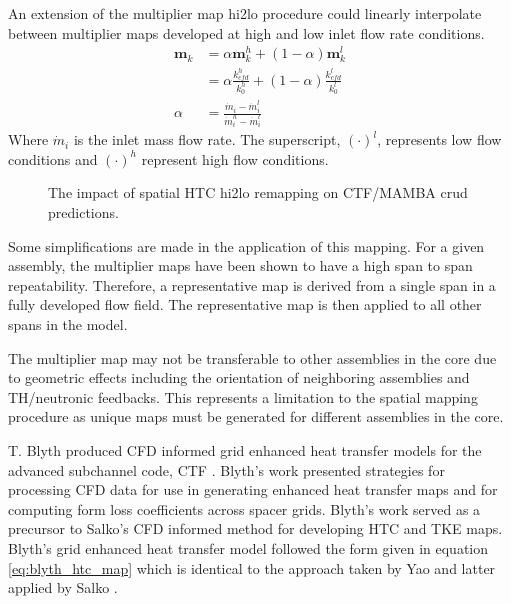     An extension of the multiplier map hi2lo procedure could linearly interpolate between multiplier maps developed at high and low inlet flow rate conditions.
    \begin{align*}
        \mathbf m_k &= \alpha \mathbf m_k^h + (1 - \alpha) \mathbf m_k^l \\
                    &= \alpha \frac{k^h_{cfd}}{k^h_0} + (1 - \alpha) \frac{k^l_{cfd}}{k^l_0} \\
        \alpha & = \frac{\dot m_i - \dot m_i^l }{\dot m_i^h - \dot m_i^l}
    \end{align*}
    Where $\dot m_i$ is the inlet mass flow rate.  The superscript, $(\cdot)^l$, represents low flow conditions and $(\cdot)^h$ represent high flow conditions.


\begin{figure}[H]%
    \centering
    \qquad
    \caption[The impact of spatial HTC hi2lo remapping on CTF/MAMBA crud predictions.]{The impact of spatial HTC hi2lo remapping on CTF/MAMBA crud predictions.}%
    \label{fig:htc_remap_crud}%
\end{figure}


Some simplifications are made in the application of this mapping.  For a given assembly, the multiplier maps have been shown to have a high span to span repeatability.  Therefore, a representative map is derived from a single span in a fully developed flow field.  The representative map is then applied to all other spans in the model.

The multiplier map may not be transferable to other assemblies in the core due to geometric effects including the orientation of neighboring assemblies and TH/neutronic feedbacks.  This represents a limitation to the spatial mapping procedure as unique maps must be generated for different assemblies in the core.

T. Blyth produced CFD informed grid enhanced heat transfer models for the advanced subchannel code, CTF \cite{blyth2014} \cite{blyth2017}.  Blyth's work presented strategies for processing CFD data for use in generating enhanced heat transfer maps and for computing form loss coefficients across spacer grids.  Blyth's work served as a precursor to Salko's CFD informed method for developing HTC and TKE maps.  Blyth's grid enhanced heat transfer model followed the form given in equation \ref{eq:blyth_htc_map} which is identical to the approach taken by Yao and latter applied by Salko \cite{yao82} \cite{salko17}.

